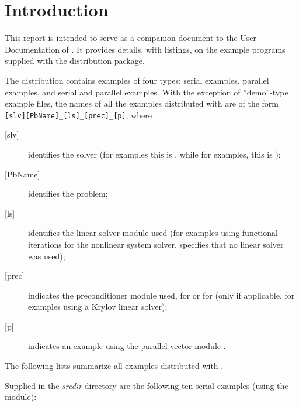 \section{Introduction}\label{s:ex_intro}

This report is intended to serve as a companion document to the User
Documentation of {\cvode} \cite{cvode_ug}.  It provides details, with
listings, on the example programs supplied with the {\cvode} distribution
package.

The {\cvode} distribution contains examples of four types: serial
{\C} examples, parallel {\C} examples, and serial and parallel {\F}
examples.  
With the exception of ''demo''-type example files, the names of all the examples 
distributed with {\sundials} are of the form \verb![slv][PbName]_[ls]_[prec]_[p]!, 
where
\begin{description}
\item [{[slv]}] identifies the solver (for {\cvode} examples this is , 
  while for {\fcvode} examples, this is );
\item [{[PbName]}] identifies the problem;
\item [{[ls]}] identifies the linear solver module used (for examples using
  functional iterations for the nonlinear system solver,  specifies
  that no linear solver was used);
\item [{[prec]}] indicates the {\cvode} preconditioner module used,  for {\cvbandpre}
  or  for {\cvbbdpre} 
  (only if applicable, for examples using a Krylov linear solver);
\item [{[p]}] indicates an example using the parallel vector module {\nvecp}.
\end{description}

\vspace{0.2in}\noindent
The following lists summarize all examples distributed with {\cvode}.

\vspace{0.2in}\noindent
Supplied in the {\em srcdir} directory are the
following ten serial examples (using the {\nvecs} module):

